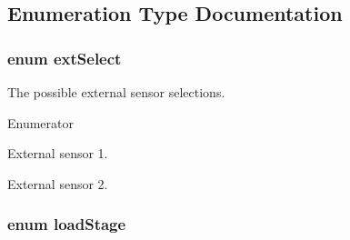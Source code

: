 \subsection{Enumeration Type Documentation}
\hypertarget{a00027_a258413561252a6c94af200747272a9f3}{
\subsubsection[{ext\-Select}]{\setlength{\rightskip}{0pt plus 5cm}enum {\bf ext\-Select}}}\label{a00027_a258413561252a6c94af200747272a9f3}
The possible external sensor selections. \begin{Desc}
\item[Enumerator]\par
\begin{description}
\item[{\em 
\hypertarget{a00027_a258413561252a6c94af200747272a9f3a6b8e8e9bb4b53b3fc029110541623a3c}{ext1}\label{a00027_a258413561252a6c94af200747272a9f3a6b8e8e9bb4b53b3fc029110541623a3c}
}]External sensor 1. \item[{\em 
\hypertarget{a00027_a258413561252a6c94af200747272a9f3a6b3e8213ce7722257795b7a3ffb915fc}{ext2}\label{a00027_a258413561252a6c94af200747272a9f3a6b3e8213ce7722257795b7a3ffb915fc}
}]External sensor 2. \end{description}
\end{Desc}
\hypertarget{a00027_a2820f1e18d921d2f1e97d53404b9fbae}{
\subsubsection[{load\-Stage}]{\setlength{\rightskip}{0pt plus 5cm}enum {\bf load\-Stage}}}\label{a00027_a2820f1e18d921d2f1e97d53404b9fbae}
